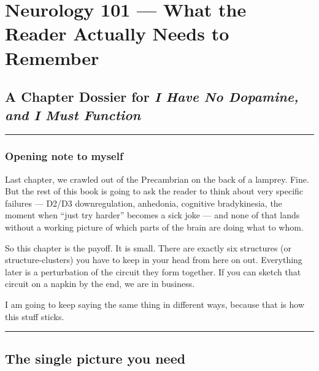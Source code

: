 ﻿\section{Neurology 101 --- What the Reader Actually Needs to Remember}\label{06_neurology_101-neurology-101-what-the-reader-actually-needs-to-remember}

\subsection{\texorpdfstring{A Chapter Dossier for \emph{I Have No Dopamine, and I Must Function}}{A Chapter Dossier for I Have No Dopamine, and I Must Function}}\label{06_neurology_101-a-chapter-dossier-for-i-have-no-dopamine-and-i-must-function}

\begin{center}\rule{0.5\linewidth}{0.5pt}\end{center}

\subsubsection{Opening note to myself}\label{06_neurology_101-opening-note-to-myself}

Last chapter, we crawled out of the Precambrian on the back of a lamprey. Fine. But the rest of this book is going to ask the reader to think about very specific failures --- D2/D3 downregulation, anhedonia, cognitive bradykinesia, the moment when ``just try harder'' becomes a sick joke --- and none of that lands without a working picture of which parts of the brain are doing what to whom.

So this chapter is the payoff. It is small. There are exactly six structures (or structure-clusters) you have to keep in your head from here on out. Everything later is a perturbation of the circuit they form together. If you can sketch that circuit on a napkin by the end, we are in business.

I am going to keep saying the same thing in different ways, because that is how this stuff sticks.

\begin{center}\rule{0.5\linewidth}{0.5pt}\end{center}

\subsection{The single picture you need}\label{06_neurology_101-the-single-picture-you-need}

